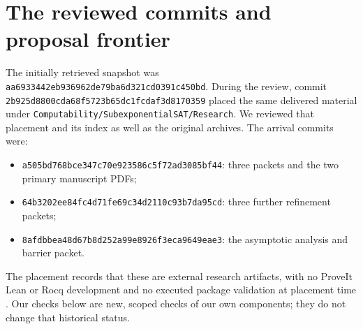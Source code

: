 \documentclass[11pt,letterpaper]{article}
\theoremstyle{remark}\newtheorem{remark}[theorem]{Remark}
\begin{document}
\section{The reviewed commits and proposal frontier}
\label{sec:review}
The initially retrieved snapshot was
\texttt{aa6933442eb936962de79ba6d321cd0391c450bd}. During the review,
commit \texttt{2b925d8800cda68f5723b65dc1fcdaf3d8170359}
placed the same delivered material under
\texttt{Computability/SubexponentialSAT/Research}. We reviewed that
placement and its index as well as the original archives. The arrival
commits were:
\begin{itemize}[leftmargin=1.5em]
\item \texttt{a505bd768bce347c70e923586c5f72ad3085bf44}: three packets
and the two primary manuscript PDFs;
\item \texttt{64b3202ee84fc4d71fe69c34d2110c93b7da95cd}: three further
refinement packets;
\item \texttt{8afdbbea48d67b8d252a99e8926f3eca9649eae3}: the asymptotic
analysis and barrier packet.
\end{itemize}
The placement records that these are external research artifacts, with
no ProveIt Lean or Rocq development and no executed package validation
at placement time \cite{repoindex}. Our checks below are new, scoped
checks of our own components; they do not change that historical status.
\end{document}
